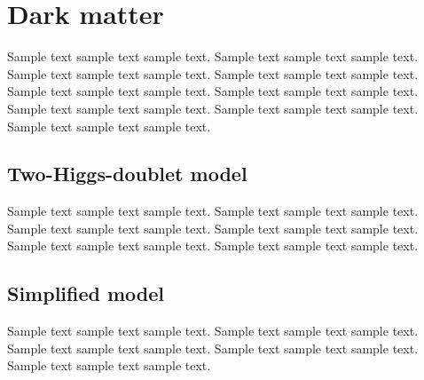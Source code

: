 \chapter{Dark matter}

Sample text sample text sample text. Sample text sample text sample text.
Sample text sample text sample text. Sample text sample text sample text.
Sample text sample text sample text. Sample text sample text sample text.
Sample text sample text sample text. Sample text sample text sample text.
Sample text sample text sample text. \cite{MonoHiggs-Berlin2014}

\section{Two-Higgs-doublet model}
Sample text sample text sample text. Sample text sample text sample text.
Sample text sample text sample text. Sample text sample text sample text.
Sample text sample text sample text. Sample text sample text sample text.

\section{Simplified model}
Sample text sample text sample text. Sample text sample text sample text.
Sample text sample text sample text. Sample text sample text sample text.
Sample text sample text sample text. \cite{SimplifiedModels-Alves2012}

